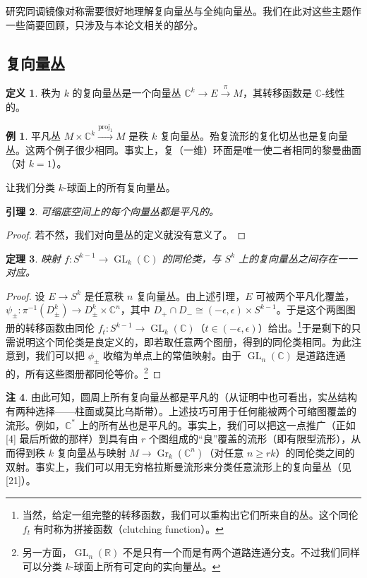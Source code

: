 \documentclass[11pt,a4paper]{article}
\theoremstyle{plain}
\newtheorem{theorem}{定理}[section]
\newtheorem{lemma}[theorem]{引理}
\theoremstyle{definition}
\newtheorem{definition}[theorem]{定义}
\newtheorem{remark}[theorem]{注}
\newtheorem*{example}{例}
\begin{document}
研究同调镜像对称需要很好地理解复向量丛与全纯向量丛。我们在此对这些主题作一些简要回顾，只涉及与本论文相关的部分。

\subsection{复向量丛}

\begin{definition}
秩为 $k$ 的复向量丛是一个向量丛 $\mathbb{C}^k\to E\xrightarrow{\pi}M$，其转移函数是 $\mathbb{C}$-线性的。
\end{definition}

\begin{example}
平凡丛 $M\times\mathbb{C}^k\xrightarrow{\operatorname{proj}_1}M$ 是秩 $k$ 复向量丛。殆复流形的复化切丛也是复向量丛。这两个例子很少相同。事实上，复（一维）环面是唯一使二者相同的黎曼曲面（对 $k=1$）。
\end{example}

让我们分类 $k$-球面上的所有复向量丛。

\begin{lemma}
可缩底空间上的每个向量丛都是平凡的。
\end{lemma}
\begin{proof}
若不然，我们对向量丛的定义就没有意义了。
\end{proof}

\begin{theorem}
映射 $f\colon S^{k-1}\to\operatorname{GL}_k(\mathbb{C})$ 的同伦类，与 $S^k$ 上的复向量丛之间存在一一对应。
\end{theorem}
\begin{proof}
设 $E\to S^k$ 是任意秩 $n$ 复向量丛。由上述引理，$E$ 可被两个平凡化覆盖，$\psi_\pm\colon\pi^{-1}(D^k_\pm)\to D^k_\pm\times\mathbb{C}^n$，其中 $D_+\cap D_-\cong(-\epsilon,\epsilon)\times S^{k-1}$。于是这个两图图册的转移函数由同伦 $f_t\colon S^{k-1}\to\operatorname{GL}_k(\mathbb{C})$（$t\in(-\epsilon,\epsilon)$）给出。\footnote{当然，给定一组完整的转移函数，我们可以重构出它们所来自的丛。这个同伦 $f_t$ 有时称为拼接函数（clutching function）。}于是剩下的只需说明这个同伦类是良定义的，即若取任意两个图册，得到的同伦类相同。为此注意到，我们可以把 $\phi_\pm$ 收缩为单点上的常值映射。由于 $\operatorname{GL}_n(\mathbb{C})$ 是道路连通的，所有这些图册都同伦等价。\footnote{另一方面，$\operatorname{GL}_n(\mathbb{R})$ 不是只有一个而是有两个道路连通分支。不过我们同样可以分类 $k$-球面上所有可定向的实向量丛。}
\end{proof}

\begin{remark}
由此可知，圆周上所有复向量丛都是平凡的（从证明中也可看出，实丛结构有两种选择——柱面或莫比乌斯带）。上述技巧可用于任何能被两个可缩图覆盖的流形。例如，$\mathbb{C}^*$ 上的所有丛也是平凡的。事实上，我们可以把这一点推广（正如 [4] 最后所做的那样）到具有由 $r$ 个图组成的“良”覆盖的流形（即有限型流形），从而得到秩 $k$ 复向量丛与映射 $M\to\operatorname{Gr}_k(\mathbb{C}^n)$（对任意 $n\ge rk$）的同伦类之间的双射。事实上，我们可以用无穷格拉斯曼流形来分类任意流形上的复向量丛（见 [21]）。
\end{remark}
\end{document}
